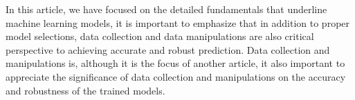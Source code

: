
\par
In this article, we have focused on the detailed fundamentals that underline machine learning models, it is important to emphasize that in addition to proper model selections, data collection and data manipulations are also critical perspective to achieving accurate and robust prediction. Data collection and manipulations is, although it is the focus of another article, it also important to appreciate the significance of data collection and manipulations on the accuracy and robustness of the trained models.
\par 
